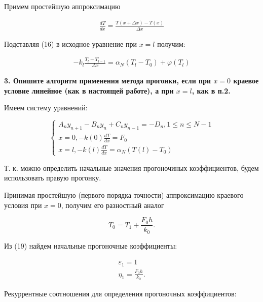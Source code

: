 \documentclass[a4paper,14pt]{article}
\begin{document}
Примем простейшую аппроксимацию

\begin{eqnarray}
	\frac{dT}{dx} = \frac{T(x + \Delta x) - T(x)}{\Delta x}
\end{eqnarray}

Подставляя (16) в исходное уравнение при $x = l$ получим:

\begin{eqnarray}
	-k_l \frac{T_l -T_{l-1}}{\Delta x} = \alpha_N(T_l - T_0) + \varphi(T_l)
\end{eqnarray}

\textbf{3. Опишите алгоритм применения метода прогонки, если при $x = 0$ 
краевое условие линейное (как в настоящей работе), а при $x = l$, как в п.2.}

Имеем систему уравнений:

\begin{equation*}
	\begin{cases}
		A_n y_{n+1} - B_n y_n + C_n y_{n-1} = - D_n, 1 \leq n \leq N -1 \\
		x = 0, -k(0) \frac{dT}{dx} = F_0 \\
		x = l, -k(l) \frac{dT}{dx} = \alpha_N \left( T(l) - T_0 \right)
	\end{cases}
\end{equation*}

Т. к. можно определить начальные значения прогоночиных коэффициентов,
будем использовать правую прогонку.

Принимая простейшую (первого порядка точности) аппроксимацию краевого
условия при $x = 0$, получим его разностный аналог

\begin{equation}
	T_0 = T_1 + \frac{F_0 h}{k_0}.
\end{equation}

Из (19) найдем начальные прогоночные коэффициенты:

\begin{eqnarray}
	\varepsilon_1 = 1 \nonumber \\
	\eta_1 = \frac{F_0 h}{k_0}.
\end{eqnarray}

Рекуррентные соотношения для определения прогоночных коэффициентов:
\end{document}
